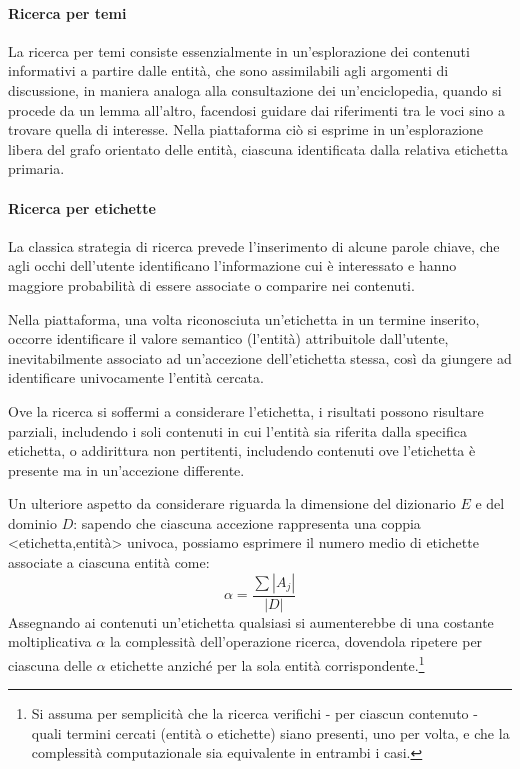 \paragraph{Ricerca per temi}
La ricerca per temi consiste essenzialmente in un'esplorazione dei contenuti informativi a partire dalle entità, che sono assimilabili agli argomenti di discussione, in maniera analoga alla consultazione dei un'enciclopedia, quando si procede da un lemma all'altro, facendosi guidare dai riferimenti tra le voci sino a trovare quella di interesse. Nella piattaforma ciò si esprime in un'esplorazione libera del grafo orientato delle entità, ciascuna identificata dalla relativa etichetta primaria.

\paragraph{Ricerca per etichette}
La classica strategia di ricerca prevede l'inserimento di alcune parole chiave, che agli occhi dell'utente identificano l'informazione cui è interessato e hanno maggiore probabilità di essere associate o comparire nei contenuti.

Nella piattaforma, una volta riconosciuta un'etichetta in un termine inserito, occorre identificare il valore semantico (l'entità) attribuitole dall'utente, inevitabilmente associato ad un'accezione dell'etichetta stessa, così da giungere ad identificare univocamente l'entità cercata.

Ove la ricerca si soffermi a considerare l’etichetta, i risultati possono risultare parziali, includendo i soli contenuti in cui l’entità sia riferita dalla specifica etichetta, o addirittura non pertitenti, includendo contenuti ove l'etichetta è presente ma in un'accezione differente.

Un ulteriore aspetto da considerare riguarda la dimensione del dizionario $E$ e del dominio $D$: sapendo che ciascuna accezione rappresenta una coppia <etichetta,entità> univoca, possiamo esprimere il numero medio di etichette associate a ciascuna entità come:
\begin{equation}
\alpha = \frac{\sum{\left|A_j\right|}}{\left|D\right|}
\end{equation}
Assegnando ai contenuti un'etichetta qualsiasi si aumenterebbe di una costante moltiplicativa $\alpha$ la complessità dell'operazione ricerca, dovendola ripetere per ciascuna delle $\alpha$ etichette anziché per la sola entità corrispondente.\footnote{Si assuma per semplicità che la ricerca verifichi - per ciascun contenuto - quali termini cercati (entità o etichette) siano presenti, uno per volta, e che la complessità computazionale sia equivalente in entrambi i casi.}

